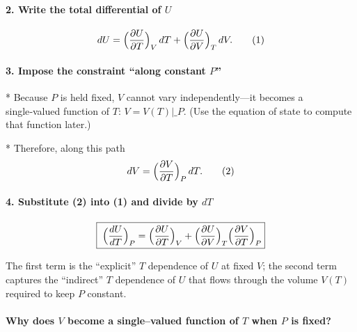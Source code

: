 \documentclass[12pt]{article}
\theoremstyle{definition} %
\theoremstyle{plain} %
\begin{document}
\paragraph{2.  Write the total differential of \(U\)}
\[
dU
  = \Bigl(\frac{\partial U}{\partial T}\Bigr)_{V}\,dT
  + \Bigl(\frac{\partial U}{\partial V}\Bigr)_{T}\,dV.
\tag{1}
\]

\paragraph{3.  Impose the constraint “along constant \(P\)”}

* Because \(P\) is held fixed, \(V\) cannot vary independently—it becomes a single‑valued function of \(T\): \(V=V(T)\bigl|\_{P}\).  
  (Use the equation of state to compute that function later.)

* Therefore, along this path
  \[
    dV = \Bigl(\frac{\partial V}{\partial T}\Bigr)_{P}\,dT.
  \tag{2}
  \]

\paragraph{4.  Substitute (2) into (1) and divide by \(dT\)}

\[
\boxed{\;
\Bigl(\frac{dU}{dT}\Bigr)_{P}
  = \Bigl(\frac{\partial U}{\partial T}\Bigr)_{V}
  + \Bigl(\frac{\partial U}{\partial V}\Bigr)_{T}
    \Bigl(\frac{\partial V}{\partial T}\Bigr)_{P}}
\]

The first term is the “explicit” \(T\) dependence of \(U\) at fixed \(V\);  
the second term captures the “indirect” \(T\) dependence of \(U\) that flows through the volume \(V(T)\) required to keep \(P\) constant.
\paragraph{Why does $V$ become a single–valued function of $T$ when $P$ is fixed?}
\end{document}
